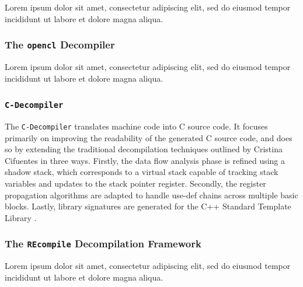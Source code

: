 \documentclass[12pt, a4paper]{article}
\begin{document}
Lorem ipsum dolor sit amet, consectetur adipiscing elit, sed do eiusmod tempor incididunt ut labore et dolore magna aliqua.

\cite{rev_comp}


\subsubsection{The \texttt{opencl} Decompiler}

Lorem ipsum dolor sit amet, consectetur adipiscing elit, sed do eiusmod tempor incididunt ut labore et dolore magna aliqua.

\cite{decomp_llvm}


\subsubsection{\texttt{C-Decompiler}}

The \texttt{C-Decompiler} translates machine code into C source code. It focuses primarily on improving the readability of the generated C source code, and does so by extending the traditional decompilation techniques outlined by Cristina Cifuentes in three ways. Firstly, the data flow analysis phase is refined using a shadow stack, which corresponds to a virtual stack capable of tracking stack variables and updates to the stack pointer register. Secondly, the register propagation algorithms are adapted to handle use-def chains across multiple basic blocks. Lastly, library signatures are generated for the C++ Standard Template Library \cite{readable_decomp}.


\subsubsection{The \texttt{REcompile} Decompilation Framework}

Lorem ipsum dolor sit amet, consectetur adipiscing elit, sed do eiusmod tempor incididunt ut labore et dolore magna aliqua.

\cite{recompile}

\end{document}
